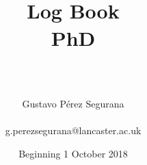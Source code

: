 \frontmatter %
\title{
\begin{center}
\HRule \\[0.4cm]
{\Huge \bfseries Log Book \\[0.5cm] \Large PhD}\\[0.4cm] %
\HRule \\[1.5cm]
\end{center}
}
\author{\Huge Gustavo P\'{e}rez Segurana \\ \\ \LARGE g.perezsegurana@lancaster.ac.uk \\[2cm]} %
\date{Beginning 1 October 2018} %
\maketitle